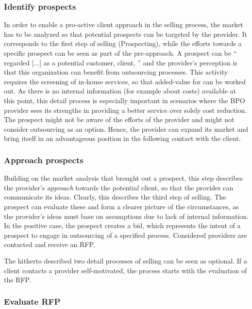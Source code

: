 	\subsubsection{Identify prospects}
	In order to enable a pro-active client approach in the selling process, the market has to be analyzed so that potential prospects can be targeted by the provider. It corresponds to the first step of selling (Prospecting), while the efforts towards a specific prospect can be seen as part of the pre-approach. 
	A prospect can be \enquote{ regarded [...] as a potential customer, client, \etc} \citep{oxfordprospect} and the provider's perception is that this organization can benefit from outsourcing processes. This activity requires the screening of in-house services, so that added-value for can be worked out. As there is no internal information (for example about costs) available at this point, this detail process is especially important in scenarios where the \acrshort{BPO} provider sees its strengths in providing a better service over solely cost reduction. The prospect might not be aware of the efforts of the provider and might not consider outsourcing as an option. Hence, the provider can expand its market and bring itself in an advantageous position in the following contact with the client. 

	
	\subsubsection{Approach prospects}
	
	Building on the market analysis that brought out a prospect, this step describes the provider's \textit{approach} towards the potential client, so that the provider can communicate its ideas. Clearly, this describes the third step of selling. The prospect can evaluate these and form a clearer picture of the circumstances, as the provider's ideas must base on assumptions due to lack of internal information. In the positive case, the prospect creates a bid, which represents the intent of a prospect to engage in outsourcing of a specified process. Considered providers are contacted and receive an \acrshort{RFP}. 
	
	The hitherto described two detail processes of selling can be seen as optional. If a client contacts a provider self-motivated, the process starts with the evaluation of the \acrshort{RFP}.
	
	\subsubsection{Evaluate \acrshort{RFP}}
	
